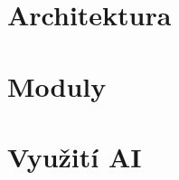 \documentclass[a4paper, 11pt]{article}
\begin{document}


\vspace{1em}
\tableofcontents
\vspace{1em}



\section{Architektura}

\section{Moduly}

\section{Využití AI}
\end{document}
